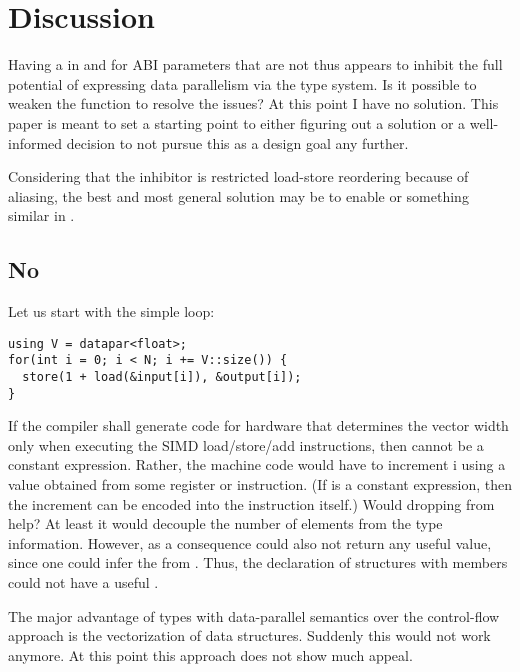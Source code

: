 \section{Discussion}

Having a   in \datapar and \mask for ABI parameters that are not  thus appears to inhibit the full potential of expressing data parallelism via the type system.
Is it possible to weaken the  function to resolve the issues?
At this point I have no solution.
This paper is meant to set a starting point to either figuring out a solution or a well-informed decision to not pursue this as a design goal any further.

Considering that the inhibitor is restricted load-store reordering because of aliasing, the best and most general solution may be to enable  or something similar in \CC{}.

\subsection{No }
Let us start with the simple loop:
\smallskip \begin{lstlisting}[style=Vc]
using V = datapar<float>;
for(int i = 0; i < N; i += V::size()) {
  store(1 + load(&input[i]), &output[i]);
}
\end{lstlisting}
If the compiler shall generate code for hardware that determines the vector width only when executing the SIMD load/store/add instructions, then  cannot be a constant expression.
Rather, the machine code would have to increment \code i using a value obtained from some register or instruction.
(If  is a constant expression, then the increment can be encoded into the instruction itself.)
Would dropping  from  help?
At least it would decouple the number of elements from the type information.
However, as a consequence  could also not return any useful value, since one could infer the  from .
Thus, the declaration of structures with \datapar members could not have a useful .

The major advantage of types with data-parallel semantics over the control-flow approach is the vectorization of data structures.
Suddenly this would not work anymore.
At this point this approach does not show much appeal.

